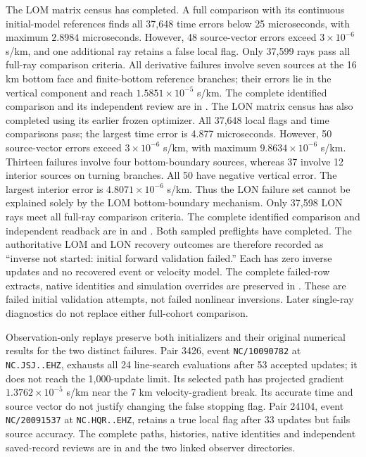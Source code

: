 The LOM matrix census has completed. A full comparison with its continuous
initial-model references finds all 37,648 time errors below 25 microseconds,
with maximum $2.8984$ microseconds. However, 48 source-vector errors exceed
$3\times10^{-6}$ s/km, and one additional ray retains a false local flag.
Only 37,599 rays pass all full-ray comparison criteria. All derivative failures involve seven
sources at the 16 km bottom face and finite-bottom reference branches; their
errors lie in the vertical component and reach $1.5851\times10^{-5}$ s/km.
The complete identified comparison and its independent review are in
.
The LON matrix census has also completed using its earlier frozen optimizer.
All 37,648 local flags and time comparisons pass; the largest time error is
4.877 microseconds. However, 50 source-vector errors exceed
$3\times10^{-6}$ s/km, with maximum $9.8634\times10^{-6}$ s/km.
Thirteen failures involve four bottom-boundary sources, whereas 37 involve
12 interior sources on turning branches. All 50 have negative vertical error.
The largest interior error is $4.8071\times10^{-6}$ s/km. Thus the LON
failure set cannot be explained solely by the LOM bottom-boundary mechanism.
Only 37,598 LON rays meet all full-ray comparison criteria. The complete identified comparison
and independent readback are in
 and
.
Both sampled preflights have completed. The authoritative LOM and LON recovery
outcomes are therefore recorded as ``inverse not started: initial forward
validation failed.'' Each has zero inverse updates and no recovered event or
velocity model. The complete failed-row extracts, native identities and
simulation overrides are preserved in
. These are failed initial
validation attempts, not failed nonlinear inversions. Later single-ray
diagnostics do not replace either full-cohort comparison.

Observation-only replays preserve both initializers and their original
numerical results for the two distinct failures. Pair 3426, event
\texttt{NC/10090782} at \texttt{NC.JSJ..EHZ}, exhausts all 24 line-search
evaluations after 53 accepted updates; it does not reach the 1,000-update
limit. Its selected path has projected gradient
$1.3762\times10^{-5}$ s/km near the 7 km velocity-gradient break. Its accurate
time and source vector do not justify changing the false stopping flag.
Pair 24104, event \texttt{NC/20091537} at \texttt{NC.HQR..EHZ}, retains a true
local flag after 33 updates but fails source accuracy. The complete paths,
histories, native identities and independent saved-record reviews are in
 and the two linked
observer directories.

